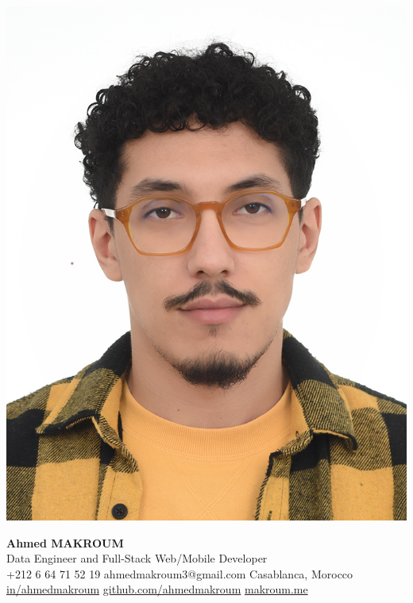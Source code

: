 \documentclass[12pt,a4paper,sans]{moderncv}
\begin{document}
    \begin{minipage}{0.15\textwidth}
        \includegraphics[width=\linewidth]{images/ahmed.jpg}
    \end{minipage}
    \hfill
    \begin{minipage}{0.82\textwidth}
        \centering
        {\fontsize{25}{28}\selectfont\textbf{Ahmed MAKROUM}}\\[0.3em]
        {\fontsize{15}{18}\selectfont Data Engineer and Full-Stack Web/Mobile Developer} \\[0.4em]
        {\fontsize{11}{13}\selectfont
            \faMobile\enspace +212 6 64 71 52 19 \quad
            \faEnvelope\enspace ahmedmakroum3@gmail.com \quad
            \faHome\enspace Casablanca, Morocco \\[0.3em]
            \faLinkedin\enspace \href{https://www.linkedin.com/in/ahmed-makroum/}{in/ahmedmakroum} \quad
            \faGithub\enspace \href{https://github.com/ahmedmakroum}{github.com/ahmedmakroum} \quad
            \faGlobe\enspace \href{https://ahmedmakroum.github.io/AhmedMakroumPortfolio/}{makroum.me}
        }
    \end{minipage}
\end{document}
